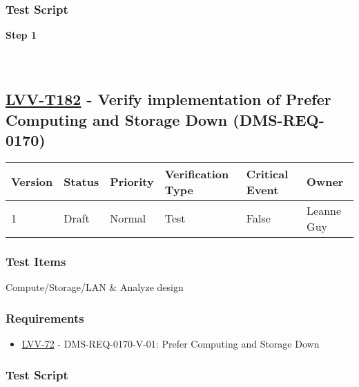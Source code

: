 \hypertarget{test-script-158}{%
\subsubsection{Test Script}\label{test-script-158}}

\textbf{Step 1}\\
~\\
~\\

\hypertarget{lvv-t182---verify-implementation-of-prefer-computing-and-storage-down-dms-req-0170}{%
\subsection{\texorpdfstring{\href{https://jira.lsstcorp.org/secure/Tests.jspa\#/testCase/LVV-T182}{LVV-T182}
- Verify implementation of Prefer Computing and Storage Down
(DMS-REQ-0170)}{LVV-T182 - Verify implementation of Prefer Computing and Storage Down (DMS-REQ-0170)}}\label{lvv-t182---verify-implementation-of-prefer-computing-and-storage-down-dms-req-0170}}

\begin{longtable}[]{@{}llllll@{}}
\toprule
Version & Status & Priority & Verification Type & Critical Event &
Owner\tabularnewline
\midrule
\endhead
1 & Draft & Normal & Test & False & Leanne Guy\tabularnewline
\bottomrule
\end{longtable}

\hypertarget{test-items-158}{%
\subsubsection{Test Items}\label{test-items-158}}

Compute/Storage/LAN \& Analyze design

\hypertarget{requirements-159}{%
\subsubsection{Requirements}\label{requirements-159}}

\begin{itemize}
\tightlist
\item
  \href{https://jira.lsstcorp.org/browse/LVV-72}{LVV-72} -
  DMS-REQ-0170-V-01: Prefer Computing and Storage Down
\end{itemize}

\hypertarget{test-script-159}{%
\subsubsection{Test Script}\label{test-script-159}}

